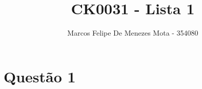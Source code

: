 \documentclass[a4paper,12pt]{article}
\title{CK0031 - Lista 1}
\author{Marcos Felipe De Menezes Mota - 354080}
\date{}
\begin{document}
\maketitle
\section{Questão 1}
\subsection{}
\end{document}
